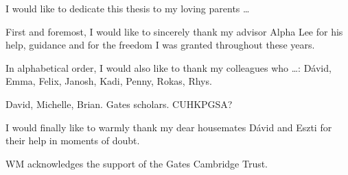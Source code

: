 
\begin{dedication} 

I would like to dedicate this thesis to my loving parents \dots

First and foremost, I would like to sincerely thank my advisor Alpha Lee for his help, guidance and for the freedom I was granted throughout these years.

In alphabetical order, I would also like to thank my colleagues who \dots: Dávid, Emma, Felix,  Janosh, Kadi, Penny, Rokas, Rhys.

David, Michelle, Brian. Gates scholars. CUHKPGSA?

I would finally like to warmly thank my dear housemates Dávid and Eszti for their help in moments of doubt.

WM acknowledges the support of the Gates Cambridge Trust.

\end{dedication}